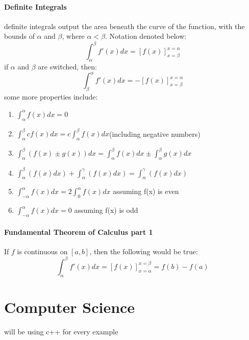 \documentclass{article} %
\begin{document}
                    \paragraph{Definite Integrals}
                        definite integrals output the area beneath the curve of the function, with the bounds of $\alpha$ and $\beta$, where $\alpha<\beta$. Notation denoted below:
                        $$\int_{\alpha}^{\beta}f'(x) dx = [f(x)]^{x=\alpha}_{x=\beta}$$ 
                        if $\alpha$ and $\beta$ are switched, then:
                        $$\int_{\beta}^{\alpha}f'(x) dx = -[f(x)]^{x=\alpha}_{x=\beta}$$
                        some more properties include:
                        \begin{enumerate}
                            \item $\int ^{\alpha}_{\alpha}f(x)dx = 0$
                            \item $\int _{\alpha}^{\beta}cf(x)dx =c\int _{\alpha}^{\beta}f(x)dx$(including negative numbers)
                            \item $\int _{\alpha}^{\beta}(f(x)\pm g(x))dx = \int _{\alpha}^{\beta}f(x)dx\pm \int _{\alpha}^{\beta} g(x)dx$
                            \item $\int _{\alpha}^{\beta}(f(x)dx)+\int ^{\gamma}_{\alpha}(f(x)dx)=\int ^{\gamma}_{\alpha}(f(x)dx)$
                            \item $\int ^{\alpha}_{-\alpha}f(x)dx=2\int ^{\alpha}_{0}f(x)dx$ assuming f(x) is even
                            \item $\int ^{\alpha}_{-\alpha}f(x)dx=0$ assuming f(x) is odd
                        \end{enumerate}
                    \paragraph{Fundamental Theorem of Calculus part 1}
                        If $f$ is continuous on $[a,b]$, then the following would be true:
                        \begin{equation}
                            \int^\beta_\alpha f'(x)dx = [f(x)]^{x=\beta}_{x=\alpha}=f(b)-f(a)
                        \end{equation}
\section{Computer Science}\label{Computer Science}
will be using c++ for every example
\end{document}
